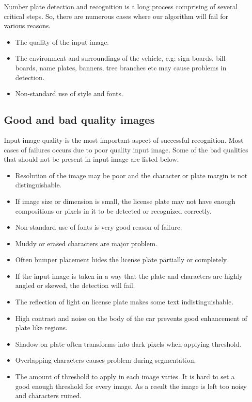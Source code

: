 Number plate detection and recognition is a long process comprising of several critical steps. So, there are numerous cases where our algorithm will fail for various reasons.

\begin{itemize}
    \item The quality of the input image.
    \item The environment and surroundings of the vehicle, e.g: sign boards, bill boards, name plates, banners, tree branches etc may cause problems in detection.
    \item Non-standard use of style and fonts.
\end{itemize}


\subsection{Good and bad quality images}
Input image quality is the most important aspect of successful recognition. Most cases of failures occurs due to poor quality input image. Some of the bad qualities that should not be present in input image are listed below.

\begin{itemize}
    \item Resolution of the image may be poor and the character or plate margin is not distinguishable.
    \item If image size or dimension is small, the license plate may not have enough compositions or pixels in it to be detected or recognized correctly.
    \item Non-standard use of fonts is very good reason of failure.
    \item Muddy or erased characters are major problem.
    \item Often bumper placement hides the license plate partially or completely.
    \item If the input image is taken in a way that the plate and characters are highly angled or skewed, the detection will fail.
    \item The reflection of light on license plate makes some text indistinguishable.
    \item High contrast and noise on the body of the car prevents good enhancement of plate like regions.
    \item Shadow on plate often transforms into dark pixels when applying threshold.
    \item Overlapping characters causes problem during segmentation.
    \item The amount of threshold to apply in each image varies. It is hard to set a good enough threshold for every image. As a result the image is left too noisy and characters ruined.
\end{itemize}

